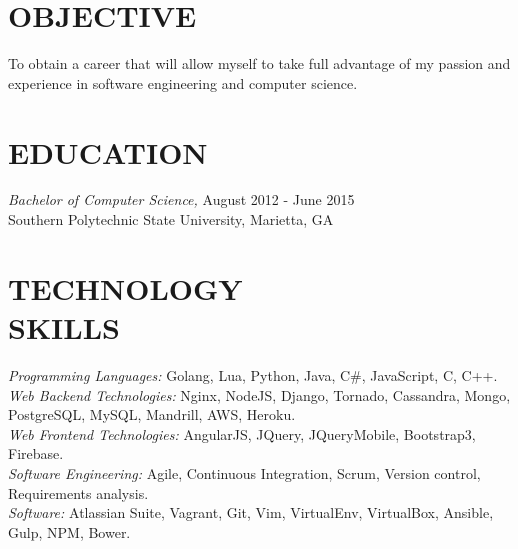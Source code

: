 \documentclass[margin, 10pt]{res} %
\begin{document}
\begin{resume}

 
\section{OBJECTIVE}  

To obtain a career that will allow myself to take full advantage of my passion and experience in software engineering and computer science. 


\section{EDUCATION}

{\sl Bachelor of Computer Science,}  \hfill August 2012 - June 2015 \\
Southern Polytechnic State University, Marietta, GA\\
 

\section{TECHNOLOGY \\ SKILLS} 

{\sl Programming Languages:} Golang, Lua, Python, Java, C\#, JavaScript, C, C++. \\
{\sl Web Backend Technologies:} Nginx, NodeJS, Django, Tornado, Cassandra, Mongo, PostgreSQL, MySQL, Mandrill, AWS, Heroku. \\
{\sl Web Frontend Technologies:} AngularJS, JQuery, JQueryMobile, Bootstrap3, Firebase. \\
{\sl Software Engineering:} Agile, Continuous Integration, Scrum, Version control, Requirements analysis. \\
{\sl Software:} Atlassian Suite, Vagrant, Git, Vim, VirtualEnv, VirtualBox, Ansible, Gulp, NPM, Bower. \\
 

\end{resume}
\end{document}
